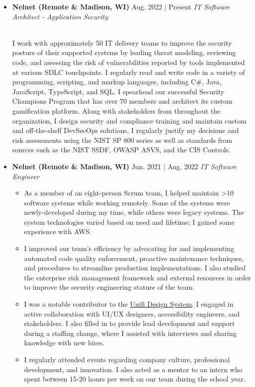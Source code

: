\documentclass[11pt]{article}
\newcommand{\job}[3]{\vspace{1.5mm}
  \textbf{#1} \hfill #2 \linebreak \textit{#3}
}
\begin{document}
\begin{itemize}[leftmargin=*]
	\item[]
	      \job
	      {Nelnet (Remote \& Madison, WI)}
	      {Aug. 2022 | Present}
	      {IT Software Architect - Application Security}
               {\\I work with approximately 50 IT delivery teams to improve the security posture of their supported systems by leading threat modeling, reviewing code, and assessing the risk of vulnerabilities reported by tools implemented at various SDLC touchpoints. I regularly read and write code in a variety of programming, scripting, and markup languages, including C\#, Java, JavaScript, TypeScript, and SQL. I spearhead our successful Security Champions Program that has over 70 members and architect its custom gamification platform. Along with stakeholders from throughout the organization, I design security and compliance training and maintain custom and off-the-shelf DevSecOps solutions. I regularly justify my decisions and risk assessments using the NIST SP 800 series as well as standards from sources such as the NIST SSDF, OWASP ASVS, and the CIS Controls.}
	\item[]
	      \job
	      {Nelnet (Remote \& Madison, WI)}
	      {Jun. 2021 | Aug. 2022}
	      {IT Software Engineer}
	      \begin{itemize}
	      	\item As a member of an eight-person Scrum team, I helped maintain >10 software systems while working remotely. Some of the systems were newly-developed during my time, while others were legacy systems. The system technologies varied based on need and lifetime; I gained some experience with AWS.
                     \item I improved our team's efficiency by advocating for and implementing automated code quality enforcement, proactive maintenance techniques, and procedures to streamline production implementations. I also studied the enterprise risk management framework and external resources in order to improve the security engineering stature of the team.
                     \item I was a notable contributor to the \href{https://unifi.nelnet.io/}{Unifi Design System}. I engaged in active collaboration with UI/UX designers, accessibility engineers, and stakeholders. I also filled in to provide lead development and support during a staffing change, where I assisted with interviews and sharing knowledge with new hires.
                     \item I regularly attended events regarding company culture, professional development, and innovation. I also acted as a mentor to an intern who spent between 15-20 hours per week on our team during the school year.

\end{itemize}
\end{itemize}
\end{document}
